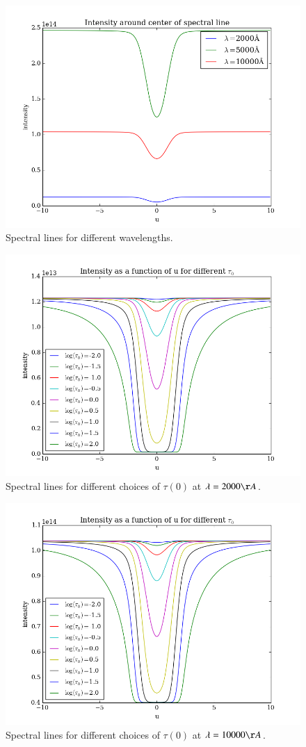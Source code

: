 \documentclass{aa}   %
\begin{document}
\begin{figure}
 \includegraphics[width=.49\textwidth]{emergent_line_orig.png}
 \caption{Spectral lines for different wavelengths.}
 \label{emergent_line_orig}
\end{figure}
\begin{figure}
 \includegraphics[width=.49\textwidth]{emergent_line_log_2000.png}
 \caption{Spectral lines for different choices of $\tau(0)$ at $\lambda = 2000 \AA$.}
 \label{emergent_line_log_2000} 
\end{figure}
\begin{figure}
 \includegraphics[width=.49\textwidth]{emergent_line_log_10000.png}
 \caption{Spectral lines for different choices of $\tau(0)$ at $\lambda = 10000 \AA$.}
 \label{emergent_line_log_10000} 
\end{figure}
\end{document}
